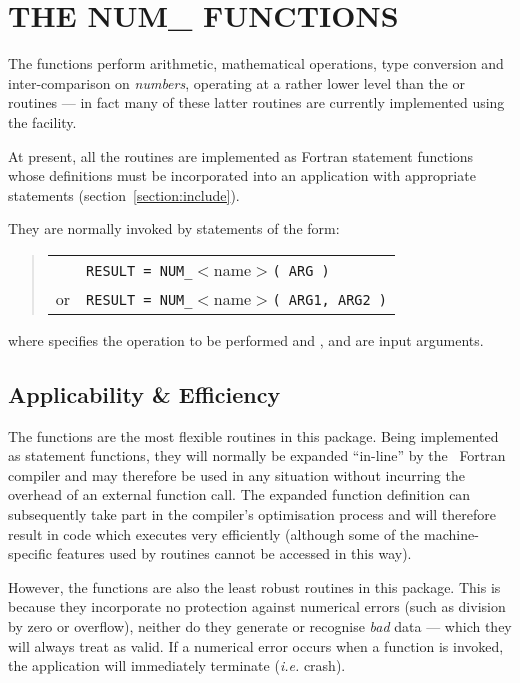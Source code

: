 \section{THE NUM\_ FUNCTIONS}

\label{section:num}

The  functions perform arithmetic, mathematical operations, type
conversion and inter-comparison on {\em numbers}, operating at a rather
lower level than the  or  routines --- in fact many
of these latter routines are currently implemented using the 
facility.

At present, all the  routines are implemented as Fortran
statement functions whose definitions must be incorporated into an
application with appropriate  statements
(section~\ref{section:include}).

They are normally invoked by statements of the form:

\begin{quote}
\begin{tabular}{rl}
& \verb#RESULT = NUM_#$<$name$>$\verb#( ARG )#\\
or & \verb#RESULT = NUM_#$<$name$>$\verb#( ARG1, ARG2 )#
\end{tabular}
\end{quote}

where  specifies the operation to be performed and
,  and  are input arguments.

\subsection{Applicability \& Efficiency}

The  functions are the most flexible routines in this package.
Being implemented as statement functions, they will normally be expanded
``in-line'' by the ~Fortran compiler and may therefore be used in
any situation without incurring the overhead of an external function call.
The expanded function definition can subsequently take part in the
compiler's optimisation process and will therefore result in code which
executes very efficiently (although some of the machine-specific features
used by  routines cannot be accessed in this way).

However, the  functions are also the least robust routines in
this package.
This is because they incorporate no protection against numerical errors
(such as division by zero or overflow), neither do they generate or
recognise {\em bad} data --- which they will always treat as valid.
If a numerical error occurs when a  function is invoked, the
application will immediately terminate ({\em i.e.} crash).


